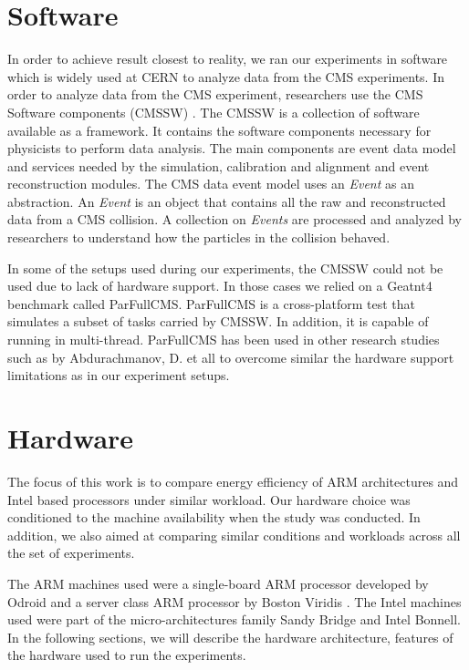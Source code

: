 \section{Software}

In order to achieve result closest to reality, we ran our experiments in software which is widely used at CERN to analyze data from the CMS experiments. In order to analyze data from the CMS experiment, researchers use the CMS Software components (CMSSW) \cite{CMSSW_WORKBOOK}. The CMSSW is a collection of software available as a framework. It contains the software components necessary for physicists to perform data analysis. The main components are event data model and services needed by the simulation, calibration and alignment and event reconstruction modules. The CMS data event model uses an  \textit{Event} as an abstraction. An \textit{Event} is an object that contains all the raw and reconstructed data from a CMS collision. A collection on \textit{Events} are processed and analyzed by researchers to understand how the particles in the collision behaved.

In some of the setups used during our experiments, the CMSSW could not be used due to lack of hardware support. In those cases we relied on a Geatnt4 benchmark \cite{GEANT4} called ParFullCMS. ParFullCMS is a cross-platform test that simulates a subset of tasks carried by CMSSW. In addition, it is capable of running in multi-thread. ParFullCMS has been used in other research studies such as by Abdurachmanov, D. et all \cite{ACAT14ARMDAVID} to overcome similar the hardware support limitations as in our experiment setups.


\section{Hardware}
The focus of this work is to compare energy efficiency of ARM architectures and Intel based 
processors under similar workload. Our hardware choice  was conditioned to the
machine availability when the study was conducted. In addition, we also aimed
at comparing similar conditions and workloads across all the set of experiments. 

The ARM machines used were a single-board ARM processor developed by Odroid
\cite{ODROID_XU3} and a server class ARM processor by Boston 
Viridis \cite{VIRIDIS}. The Intel machines used were part of the micro-architectures family Sandy Bridge and Intel Bonnell. In the following sections, we will describe the hardware architecture, features of the hardware used to run the experiments.

